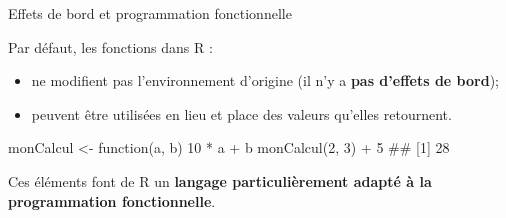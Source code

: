 \documentclass[12pt,ignorenonframetext,handout,]{beamer}
\newenvironment{Shaded}{}{}
\newcommand{\ControlFlowTok}[1]{\textcolor[rgb]{0.00,0.00,1.00}{#1}}
\newcommand{\DecValTok}[1]{#1}
\newcommand{\KeywordTok}[1]{\textcolor[rgb]{0.00,0.00,1.00}{#1}}
\newcommand{\NormalTok}[1]{#1}
\newcommand{\OperatorTok}[1]{#1}
\newcommand{\StringTok}[1]{\textcolor[rgb]{0.00,0.50,0.50}{#1}}
\providecommand{\tightlist}{%
  \setlength{\itemsep}{0pt}\setlength{\parskip}{0pt}}
\renewenvironment{Shaded}{\begin{snugshade}}{\end{snugshade}}
\begin{document}
\begin{frame}[fragile]{\large Effets de bord et programmation
fonctionnelle}
\protect\hypertarget{effets-de-bord-et-programmation-fonctionnelle}{}

Par défaut, les fonctions dans R :

\begin{itemize}
\tightlist
\item
  ne modifient pas l’environnement d’origine (il n’y a \textbf{pas
  d’effets de bord});
\item
  peuvent être utilisées en lieu et place des valeurs qu’elles
  retournent.
\end{itemize}

\begin{Shaded}
\begin{Highlighting}[]
\NormalTok{monCalcul <-}\StringTok{  }\ControlFlowTok{function}\NormalTok{(a, b) }\DecValTok{10} \OperatorTok{*}\StringTok{ }\NormalTok{a }\OperatorTok{+}\StringTok{ }\NormalTok{b}
\KeywordTok{monCalcul}\NormalTok{(}\DecValTok{2}\NormalTok{, }\DecValTok{3}\NormalTok{) }\OperatorTok{+}\StringTok{ }\DecValTok{5}
\NormalTok{  ## [1] 28}
\end{Highlighting}
\end{Shaded}

\pause Ces éléments font de R un \textbf{langage particulièrement adapté
à la programmation fonctionnelle}.

\end{frame}
\end{document}
